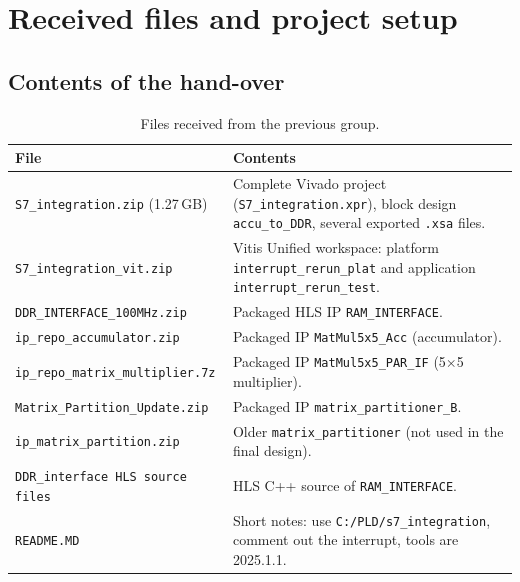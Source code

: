 \documentclass[11pt,a4paper]{article}
\newcommand{\code}[1]{\texttt{#1}}
\begin{document}
\section{Received files and project setup}

\subsection{Contents of the hand-over}
\begin{table}[h]
\centering
\begin{tabularx}{\textwidth}{@{}lY@{}}
\toprule
\textbf{File} & \textbf{Contents} \\
\midrule
\code{S7\_integration.zip} (1.27\,GB) & Complete Vivado project (\code{S7\_integration.xpr}), block design \code{accu\_to\_DDR}, several exported \code{.xsa} files. \\
\code{S7\_integration\_vit.zip} & Vitis Unified workspace: platform \code{interrupt\_rerun\_plat} and application \code{interrupt\_rerun\_test}. \\
\code{DDR\_INTERFACE\_100MHz.zip} & Packaged HLS IP \code{RAM\_INTERFACE}. \\
\code{ip\_repo\_accumulator.zip} & Packaged IP \code{MatMul5x5\_Acc} (accumulator). \\
\code{ip\_repo\_matrix\_multiplier.7z} & Packaged IP \code{MatMul5x5\_PAR\_IF} (5$\times$5 multiplier). \\
\code{Matrix\_Partition\_Update.zip} & Packaged IP \code{matrix\_partitioner\_B}. \\
\code{ip\_matrix\_partition.zip} & Older \code{matrix\_partitioner} (not used in the final design). \\
\code{DDR\_interface HLS source files} & HLS C++ source of \code{RAM\_INTERFACE}. \\
\code{README.MD} & Short notes: use \code{C:/PLD/s7\_integration}, comment out the interrupt, tools are 2025.1.1. \\
\bottomrule
\end{tabularx}
\caption{Files received from the previous group.}
\end{table}
\end{document}

